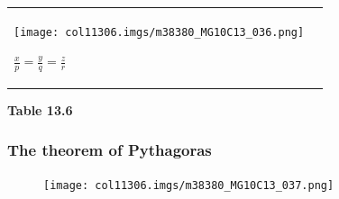\begin{table}[H]
\begin{center}
\begin{xtabular*}{\mytablewidth}[t]{|p{10\mystarwidth}|p{10\mystarwidth}|}
    
        
                    
    \setcounter{subfigure}{0}

\label{m38380*id318279}
    \begin{center}
    \label{m38380*id318279!!!underscore!!!media}\label{m38380*id318279!!!underscore!!!printimage}\texttt{[image: col11306.imgs/m38380\_MG10C13\_036.png]} %
        
      \vspace{2pt}
    \vspace{.1in}
    
    \end{center}



    \addtocounter{footnote}{-0}
    
                    \begin{math}\frac{x}{p}=\frac{y}{q}=\frac{z}{r}\end{math}
     \tabularnewline{}
    \end{xtabular*}
      \end{center}
    \begin{center}{\small\bfseries Table 13.6}\end{center}
    
    \addtocounter{footnote}{-0}
    
    \par
  
        
        \label{m38380*uid49}
        \subsubsection{ The theorem of Pythagoras}
        \nopagebreak
        
          
          \label{m38380*id318328}
    \setcounter{subfigure}{0}


	\begin{figure}[H] %
    \begin{center}
    \label{m38380*id318334!!!underscore!!!media}\label{m38380*id318334!!!underscore!!!printimage}\texttt{[image: col11306.imgs/m38380\_MG10C13\_037.png]} %
        

\end{center}
\end{figure}
\end{table}
